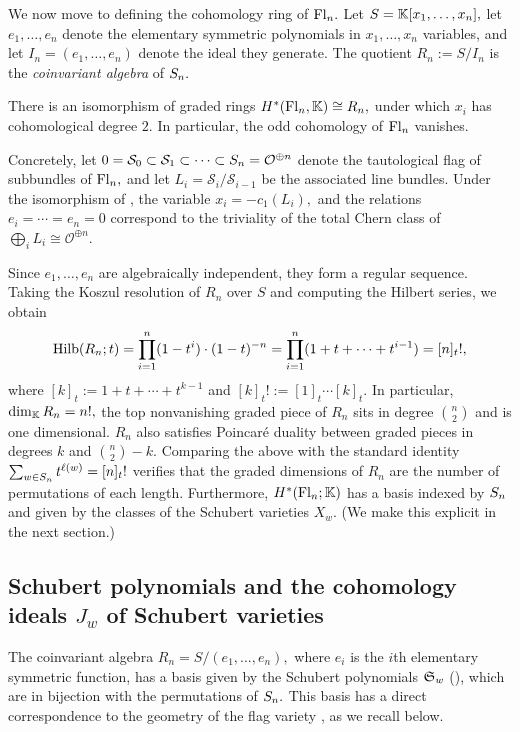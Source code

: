 We now move to defining the cohomology ring of $\mathrm{Fl}_n.$ Let $S = \mathbb{K}[x_1,\ldots,x_n],$ let $e_1,\ldots,e_n$ denote the elementary symmetric polynomials in $x_1,\ldots,x_n$ variables, and let $I_n = (e_1,\ldots,e_n)$ denote the ideal they generate. The quotient $R_n:=S/I_n$ is the \emph{coinvariant algebra} of $S_n.$

\begin{theorem}
\label{thm: Borel - flag variety isomorphism}
    There is an isomorphism of graded rings $H^*(\mathrm{Fl}_n,\mathbb{K})\cong R_n,$ under which $x_i$ has cohomological degree $2.$ In particular, the odd cohomology of $\mathrm{Fl}_n$ vanishes.
\end{theorem}

Concretely, let $0 = \mathcal{S}_0\subset\mathcal{S}_1\subset\cdots\subset S_n = \mathcal{O}^{\oplus n}$ denote the tautological flag of subbundles of $\mathrm{Fl}_n,$ and let $L_i = \mathcal{S}_i/\mathcal{S}_{i-1}$ be the associated line bundles. Under the isomorphism of , the variable $x_i = -c_1(L_i),$ and the relations $e_i = \cdots = e_n = 0$ correspond to the triviality of the total Chern class of $\bigoplus_i L_i\cong\mathcal{O}^{\oplus n}.$

Since $e_1,\dots, e_n$ are algebraically independent, they form a regular sequence. Taking the Koszul resolution of $R_n$ over $S$ and computing the Hilbert series, we obtain
\[
\mathrm{Hilb}(R_n;t) = \prod_{i=1}^n(1-t^i)\cdot(1-t)^{-n} = \prod_{i=1}^n(1+t+\cdots+t^{i-1}) = [n]_t!,
\]
where $[k]_t := 1+t+\cdots + t^{k-1}$ and $[k]_t! := [1]_t\cdots [k]_t.$ 
In particular, $\dim_{\mathbb{K}} R_n = n!,$ the top nonvanishing graded piece of $R_n$ sits in degree $\binom{n}{2}$ and is one dimensional. $R_n$ also satisfies Poincar{\'e} duality between graded pieces in degrees $k$ and $\binom{n}{2}-k.$ Comparing the above with the standard identity $\sum_{w\in S_n}t^{\ell(w)}=[n]_t!$ verifies that the graded dimensions of $R_n$ are the number of permutations of each length. Furthermore, $H^*(\mathrm{Fl}_n;\mathbb{K})$ has a basis indexed by $S_n$ and given by the classes of the Schubert varieties $X_w.$ (We make this explicit in the next section.) 

\subsection{Schubert polynomials and the cohomology ideals \texorpdfstring{$J_w$}{Jw} of Schubert varieties}
\label{subsec: Schubert stuff}
The coinvariant algebra $R_n = S/(e_1,\ldots,e_n),$ where $e_i$ is the $i$th elementary symmetric function, has a basis given by the Schubert polynomials $\mathfrak{S}_w$ (), which are in bijection with the permutations of $S_n.$ 
This basis has a direct correspondence to the geometry of the flag variety \cite{Borel1953}, as we recall below. 


